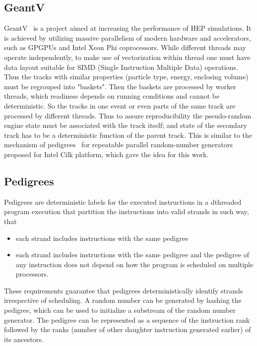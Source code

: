 \documentclass[a4paper, titlepage, 12pt]{article} %
\begin{document}
  \subsection{GeantV}
   GeantV~\cite{1742-6596-523-1-012004} is a project aimed at increasing the performance of HEP simulations.
   It is achieved by utilizing massive parallelism of modern hardware and accelerators, such as GPGPUs and Intel Xeon Phi coprocessors.
   While different threads may operate independently, to make use of vectorization within thread one must have data layout suitable for SIMD (Single Instruction Multiple Data) operations.
   Thus the tracks with similar properties (particle type, energy, enclosing volume) must be regrouped into "baskets".
   Then the baskets are processed by worker threads, which readiness depends on running conditions and cannot be deterministic.
   So the tracks in one event or even parts of the same track are processed by different threads.
   Thus to assure reproducibility the pseudo-random engine state must be associated with the track itself;
   and state of the secondary track has to be a deterministic function of the parent track.
   This is similar to the mechanism of pedigrees~\cite{Leiserson:2012:DPR:2145816.2145841, Leiserson:2012:DPR:2370036.2145841} for repeatable parallel random-number generators proposed for Intel Cilk platform, which gave the idea for this work.
   
  \subsection{Pedigrees}
   Pedigrees are deterministic labels for the executed instructions in a dthreaded program execution that partition the instructions into valid strands in such way, that
   \begin{itemize}
    \item each strand includes instructions with the same pedigree
    \item each strand includes instructions with the same pedigree and the pedigree of any instruction does not depend on how the program is scheduled on multiple processors.
   \end{itemize}
   These requirements guarantee that pedigrees deterministically identify strands irrespective of scheduling.
   A random number can be generated by hashing the pedigree, which can be used to initialize a substream of the random number generator.
   The pedigree can be represented as a sequence of the instruction rank followed by the ranks (number of other daughter instruction generated earlier) of its ancestors.
   
\end{document}

